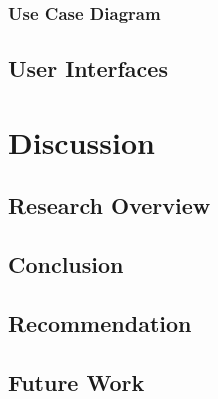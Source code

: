 \subsection{Use Case Diagram}

\section{User Interfaces}

\chapter{Discussion}\label{chapter:Discuss}
\section{Research Overview}


\section{Conclusion}

\section{Recommendation}


\section{Future Work}


